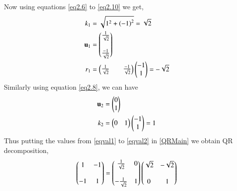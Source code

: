 \documentclass[journal,12pt,twocolumn]{IEEEtran}
\begin{document}
Now using equations \eqref{eq2.6} to \eqref{eq2.10} we get, 
\begin{align}
k_1 &= \sqrt{1^2+\left( -1\right)^2} = \sqrt{2}\label{eqval1}\\ 
\mathbf{u}_1 &= \begin{pmatrix}\frac{1}{\sqrt{2}}\\ \\ \frac{-1}{\sqrt{2}}\end{pmatrix} \\
r_1 &= \begin{pmatrix}\frac{1}{\sqrt{2}}&&\frac{-1}{\sqrt{2}}\end{pmatrix}\begin{pmatrix}-1 \\ 1\end{pmatrix} = -\sqrt{2}\\ 
\end{align}
Similarly using equation \eqref{eq2.8}, we can have 
\begin{align}
\mathbf{u}_2 &= \begin{pmatrix}0 \\  1\end{pmatrix} \\
k_2 &= \begin{pmatrix}0 & 1 \end{pmatrix}\begin{pmatrix}-1\\1\end{pmatrix} = 1\label{eqval2} 
\end{align}
Thus putting the values from \eqref{eqval1} to \eqref{eqval2} in \eqref{QRMain} we obtain QR decomposition,
\begin{align}
\begin{pmatrix}1 & -1 \\\\ -1 & 1\end{pmatrix} =\begin{pmatrix}\frac{1}{\sqrt{2}}& 0 \\\\ -\frac{1}{\sqrt{2}} & 1 \end{pmatrix}\begin{pmatrix}\sqrt{2} & -\sqrt{2} \\\\ 0 & 1 \end{pmatrix}
\end{align}
\end{document}
